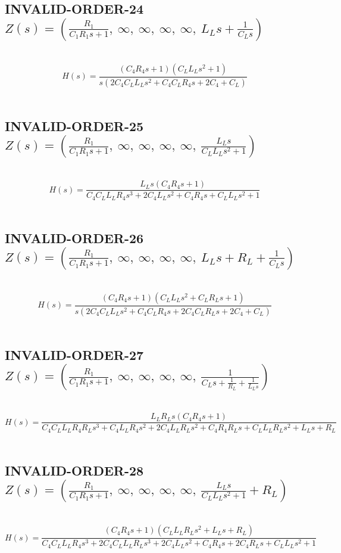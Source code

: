 \documentclass{article}
\begin{document}
\subsection{INVALID-ORDER-24 $Z(s) = \left( \frac{R_{1}}{C_{1} R_{1} s + 1}, \  \infty, \  \infty, \  \infty, \  \infty, \  L_{L} s + \frac{1}{C_{L} s}\right)$ } \ 
\textbf{\[H(s) = \frac{\left(C_{4} R_{4} s + 1\right) \left(C_{L} L_{L} s^{2} + 1\right)}{s \left(2 C_{4} C_{L} L_{L} s^{2} + C_{4} C_{L} R_{4} s + 2 C_{4} + C_{L}\right)}\] } \ 
\subsection{INVALID-ORDER-25 $Z(s) = \left( \frac{R_{1}}{C_{1} R_{1} s + 1}, \  \infty, \  \infty, \  \infty, \  \infty, \  \frac{L_{L} s}{C_{L} L_{L} s^{2} + 1}\right)$ } \ 
\textbf{\[H(s) = \frac{L_{L} s \left(C_{4} R_{4} s + 1\right)}{C_{4} C_{L} L_{L} R_{4} s^{3} + 2 C_{4} L_{L} s^{2} + C_{4} R_{4} s + C_{L} L_{L} s^{2} + 1}\] } \ 
\subsection{INVALID-ORDER-26 $Z(s) = \left( \frac{R_{1}}{C_{1} R_{1} s + 1}, \  \infty, \  \infty, \  \infty, \  \infty, \  L_{L} s + R_{L} + \frac{1}{C_{L} s}\right)$ } \ 
\textbf{\[H(s) = \frac{\left(C_{4} R_{4} s + 1\right) \left(C_{L} L_{L} s^{2} + C_{L} R_{L} s + 1\right)}{s \left(2 C_{4} C_{L} L_{L} s^{2} + C_{4} C_{L} R_{4} s + 2 C_{4} C_{L} R_{L} s + 2 C_{4} + C_{L}\right)}\] } \ 
\subsection{INVALID-ORDER-27 $Z(s) = \left( \frac{R_{1}}{C_{1} R_{1} s + 1}, \  \infty, \  \infty, \  \infty, \  \infty, \  \frac{1}{C_{L} s + \frac{1}{R_{L}} + \frac{1}{L_{L} s}}\right)$ } \ 
\textbf{\[H(s) = \frac{L_{L} R_{L} s \left(C_{4} R_{4} s + 1\right)}{C_{4} C_{L} L_{L} R_{4} R_{L} s^{3} + C_{4} L_{L} R_{4} s^{2} + 2 C_{4} L_{L} R_{L} s^{2} + C_{4} R_{4} R_{L} s + C_{L} L_{L} R_{L} s^{2} + L_{L} s + R_{L}}\] } \ 
\subsection{INVALID-ORDER-28 $Z(s) = \left( \frac{R_{1}}{C_{1} R_{1} s + 1}, \  \infty, \  \infty, \  \infty, \  \infty, \  \frac{L_{L} s}{C_{L} L_{L} s^{2} + 1} + R_{L}\right)$ } \ 
\textbf{\[H(s) = \frac{\left(C_{4} R_{4} s + 1\right) \left(C_{L} L_{L} R_{L} s^{2} + L_{L} s + R_{L}\right)}{C_{4} C_{L} L_{L} R_{4} s^{3} + 2 C_{4} C_{L} L_{L} R_{L} s^{3} + 2 C_{4} L_{L} s^{2} + C_{4} R_{4} s + 2 C_{4} R_{L} s + C_{L} L_{L} s^{2} + 1}\] } \ 
\end{document}
